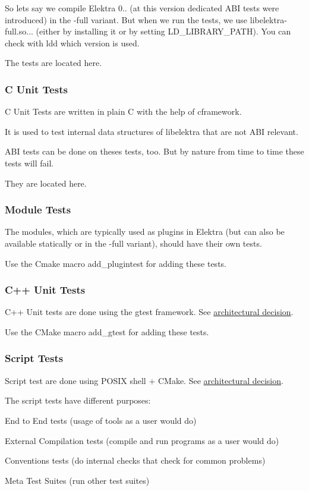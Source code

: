 So lets say we compile Elektra 0.. (at this version dedicated A\+B\+I tests were introduced) in the -\/full variant. But when we run the tests, we use libelektra-\/full.\+so... (either by installing it or by setting L\+D\+\_\+\+L\+I\+B\+R\+A\+R\+Y\+\_\+\+P\+A\+T\+H). You can check with ldd which version is used.

The tests are located here.

\subsubsection*{C Unit Tests}

C Unit Tests are written in plain C with the help of cframework.

It is used to test internal data structures of libelektra that are not A\+B\+I relevant.

A\+B\+I tests can be done on theses tests, too. But by nature from time to time these tests will fail.

They are located here.

\subsubsection*{Module Tests}

The modules, which are typically used as plugins in Elektra (but can also be available statically or in the -\/full variant), should have their own tests.

Use the Cmake macro add\+\_\+plugintest for adding these tests.

\subsubsection*{C++ Unit Tests}

C++ Unit tests are done using the gtest framework. See \hyperlink{doc_decisions_unit_testing_md}{architectural decision}.

Use the C\+Make macro add\+\_\+gtest for adding these tests.

\subsubsection*{Script Tests}

Script test are done using P\+O\+S\+I\+X shell + C\+Make. See \hyperlink{doc_decisions_script_testing_md}{architectural decision}.

The script tests have different purposes\+:
\begin{DoxyItemize}
\item End to End tests (usage of tools as a user would do)
\item External Compilation tests (compile and run programs as a user would do)
\item Conventions tests (do internal checks that check for common problems)
\item Meta Test Suites (run other test suites)
\end{DoxyItemize}

